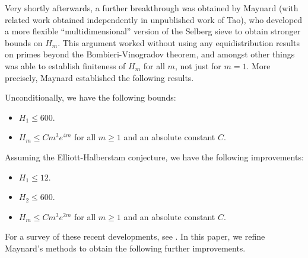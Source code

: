 Very shortly afterwards, a further breakthrough was obtained by Maynard \cite{maynard-new} (with related work obtained independently in unpublished work of Tao), who developed a more flexible ``multidimensional'' version of the Selberg sieve to obtain stronger bounds on $H_m$. This argument worked without using any equidistribution results on primes beyond the Bombieri-Vinogradov theorem, and amongst other things was able to establish finiteness of $H_m$ for all $m$, not just for $m=1$.  More precisely, Maynard established the following results.

\begin{theorem}  Unconditionally, we have the following bounds:
\begin{itemize}
\item[(i)] $H_1 \leq 600$.
\item[(ii)] $H_m \leq C m^3 e^{4m}$ for all $m \geq 1$ and an absolute constant $C$.
\end{itemize}
Assuming the Elliott-Halberstam conjecture, we have the following improvements:
\begin{itemize}
\item[(iii)] $H_1 \leq 12$.
\item[(iv)] $H_2 \leq 600$.
\item[(v)] $H_m \leq C m^3 e^{2m}$ for all $m \geq 1$ and an absolute constant $C$.
\end{itemize}
\end{theorem}

For a survey of these recent developments, see \cite{granville}.
%
In this paper, we refine Maynard's methods to obtain the following further improvements.

